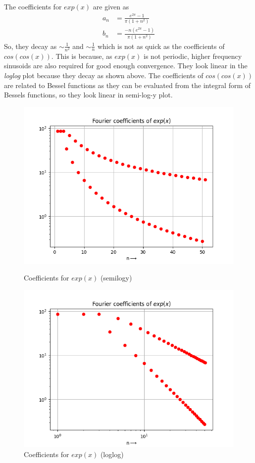 \documentclass[12pt, a4paper]{article}
\begin{document}
The coefficients for $exp(x)$ are given as
\begin{align*}
a_n &= \frac{e^{2\pi} - 1}{\pi(1 + n^2)} \\
b_n &= \frac{-n(e^{2\pi} - 1)}{\pi(1 + n^2)}
\end{align*}
So, they decay as $\sim \frac{1}{n^2}$ and $\sim \frac{1}{n}$ which is not as quick as the coefficients of $cos(cos(x))$. This is because, as $exp(x)$ is not periodic, higher frequency sinusoids are also required for good enough convergence. They look linear in the \textit{loglog} plot because they decay as shown above. The coefficients of $cos(cos(x))$ are related to Bessel functions as they can be evaluated from the integral form of Bessels functions, so they look linear in semi-log-y plot.
\begin{figure}[H]
\centering
\includegraphics[scale=0.75]{Figure_9.png}
\caption{Coefficients for $exp(x)$ (semilogy)}
\centering
\includegraphics[scale=0.75]{Figure_10.png}
\caption{Coefficients for $exp(x)$ (loglog)}
\end{figure}
\end{document}
